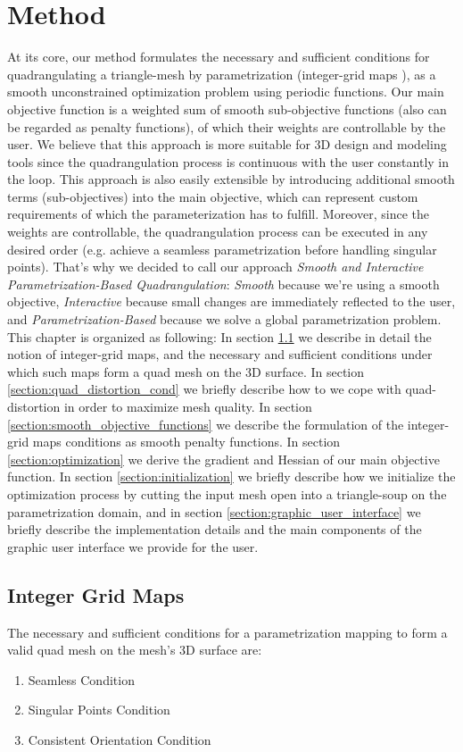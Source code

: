 \chapter{Method}
\label{chapter:method}
At its core, our method formulates the necessary and sufficient conditions for quadrangulating a triangle-mesh by parametrization (integer-grid maps \cite{bommes:hal-00862648}), as a smooth unconstrained optimization problem using periodic functions. Our main objective function is a weighted sum of smooth sub-objective functions (also can be regarded as penalty functions), of which their weights are controllable by the user. We believe that this approach is more suitable for 3D design and modeling tools since the quadrangulation process is continuous with the user constantly in the loop. This approach is also easily extensible by introducing additional smooth terms (sub-objectives) into the main objective, which can represent custom requirements of which the parameterization has to fulfill. Moreover, since the weights are controllable, the quadrangulation process can be executed in any desired order (e.g. achieve a seamless parametrization before handling singular points). That's why we decided to call our approach \emph{Smooth and Interactive Parametrization-Based Quadrangulation}: \emph{Smooth} because we're using a smooth objective, \emph{Interactive} because small changes are immediately reflected to the user, and \emph{Parametrization-Based} because we solve a global parametrization problem. This chapter is organized as following: In section \ref{integer-grid-maps} we describe in detail the notion of integer-grid maps, and the necessary and sufficient conditions under which such maps form a quad mesh on the 3D surface. In section \ref{section:quad_distortion_cond} we briefly describe how to we cope with quad-distortion in order to maximize mesh quality. In section \ref{section:smooth_objective_functions} we describe the formulation of the integer-grid maps conditions as smooth penalty functions. In section \ref{section:optimization} we derive the gradient and Hessian of our main objective function. In section \ref{section:initialization} we briefly describe how we initialize the optimization process by cutting the input mesh open into a triangle-soup on the parametrization domain, and in section \ref{section:graphic_user_interface} we briefly describe the implementation details and the main components of the graphic user interface we provide for the user.
\section{Integer Grid Maps}
\label{integer-grid-maps}
The necessary and sufficient conditions for a parametrization mapping to form a valid quad mesh on the mesh's 3D surface are:
\begin{enumerate}
\item Seamless Condition
\item Singular Points Condition
\item Consistent Orientation Condition
\end{enumerate}
